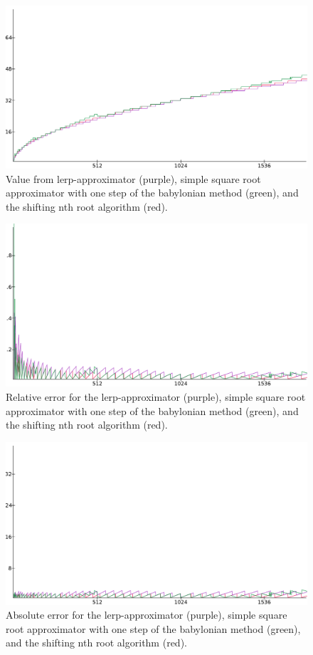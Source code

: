 		\begin{figure}[H]
			\centering
			\includegraphics[width=0.75\linewidth]{figure/value_lin12x.png} 
			\caption{Value from lerp-approximator (purple), simple square root
				approximator with one step of the babylonian method (green),
				and the shifting nth root algorithm (red).}
			\label{sres4}
		\end{figure}

		\begin{figure}[H]
			\centering
			\includegraphics[width=0.75\linewidth]{figure/rel_lin960x.png} 
			\caption{Relative error for the lerp-approximator (purple), simple 
				square root approximator with one step of the babylonian method 
				(green), and the shifting nth root algorithm (red).}
			\label{sres5}
		\end{figure}

		\begin{figure}[H]
			\centering
			\includegraphics[width=0.75\linewidth]{figure/abs_lin24x.png} 
			\caption{Absolute error for the lerp-approximator (purple), simple 
				square root approximator with one step of the babylonian method 
				(green), and the shifting nth root algorithm (red).}
			\label{sres6}
		\end{figure}

